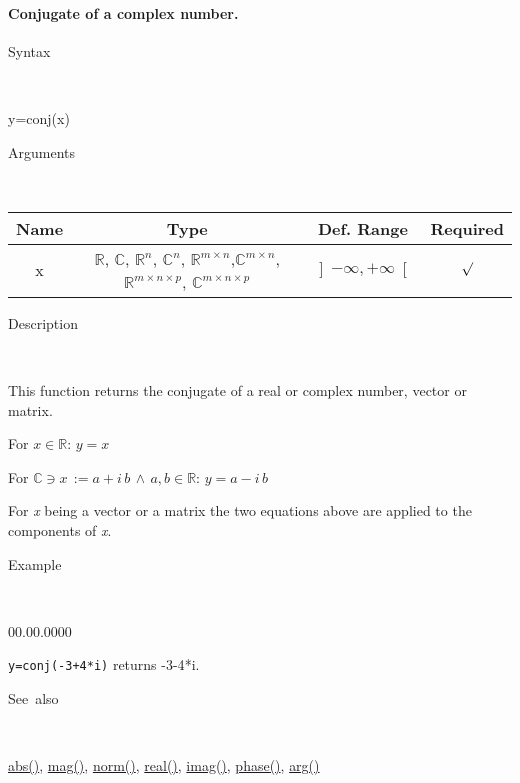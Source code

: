 \paragraph{\label{par:Conjugate}Conjugate of a complex number.}

\begin{description}
\item [Syntax]~
\end{description}
y=conj(x)

\begin{description}
\item [Arguments]~
\end{description}
\begin{tabular}{|c|c|c|c|}
\hline 
Name&
Type&
Def. Range&
Required\tabularnewline
\hline
\hline 
x&
$\mathbb{R}$, $\mathbb{C}$, $\mathbb{R}^{n}$, $\mathbb{C}^{n}$,
$\mathbb{\mathbb{R}}^{m\times n}$,$\mathbb{\mathbb{C}}^{m\times n}$,
$\mathbb{\mathbb{R}}^{m\times n\times p}$, $\mathbb{\mathbb{C}}^{m\times n\times p}$ &
$\left]-\infty,+\infty\right[$&
$\surd$\tabularnewline
\hline
\end{tabular}

\begin{description}
\item [Description]~
\end{description}
This function returns the conjugate of a real or complex number, vector
or matrix.

\medskip{}
For $x\in\mathbb{R}$: $y=x$
\medskip{}

For $\mathbb{\mathbb{C}}\ni x\,:=a+i\, b\,\wedge\, a,b\in\mathbb{R}$:
$y=a-i\, b$
\medskip{}

For \textit{x} being a vector or a matrix the two equations above
are applied to the components of \textit{x}.

\begin{description}
\item [Example]~
\end{description}
\begin{lyxlist}{00.00.0000}
\item [\texttt{y=conj(-3+4{*}i)}]returns -3-4{*}i.
\end{lyxlist}
\begin{description}
\item [See~also]~
\end{description}
\textcolor{blue}{\hyperlink{abs}{abs()}}, \textcolor{blue}{\hyperlink{mag}{mag()}},
\textcolor{blue}{\hyperlink{norm}{norm()}}, \textcolor{blue}{\hyperlink{real}{real()}},
\textcolor{blue}{\hyperlink{imag}{imag()}}, \textcolor{blue}{\hyperlink{phase}{phase()}},
\textcolor{blue}{\hyperlink{arg}{arg()}}


